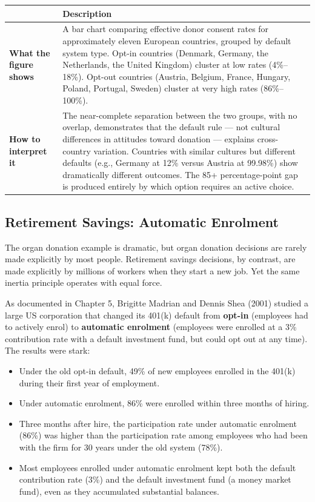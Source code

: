 \documentclass[12pt, letterpaper]{article}
\begin{document}
\begin{table}[H]
\centering
\small
\begin{tabularx}{\linewidth}{lY}
\toprule
 & Description \\
\midrule
\textbf{What the figure shows} & A bar chart comparing effective donor consent rates for approximately eleven European countries, grouped by default system type. Opt-in countries (Denmark, Germany, the Netherlands, the United Kingdom) cluster at low rates (4\%--18\%). Opt-out countries (Austria, Belgium, France, Hungary, Poland, Portugal, Sweden) cluster at very high rates (86\%--100\%). \\
\textbf{How to interpret it} & The near-complete separation between the two groups, with no overlap, demonstrates that the default rule --- not cultural differences in attitudes toward donation --- explains cross-country variation. Countries with similar cultures but different defaults (e.g., Germany at 12\% versus Austria at 99.98\%) show dramatically different outcomes. The 85+ percentage-point gap is produced entirely by which option requires an active choice. \\
\bottomrule
\end{tabularx}
\end{table}



\subsection{Retirement Savings: Automatic Enrolment}


The organ donation example is dramatic, but organ donation decisions are rarely made explicitly by most people. Retirement savings decisions, by contrast, are made explicitly by millions of workers when they start a new job. Yet the same inertia principle operates with equal force.

As documented in Chapter 5, Brigitte Madrian and Dennis Shea (2001) studied a large US corporation that changed its 401(k) default from \textbf{opt-in} (employees had to actively enrol) to \textbf{automatic enrolment} (employees were enrolled at a 3\% contribution rate with a default investment fund, but could opt out at any time). The results were stark:

\begin{itemize}
\item Under the old opt-in default, 49\% of new employees enrolled in the 401(k) during their first year of employment.
\item Under automatic enrolment, 86\% were enrolled within three months of hiring.
\item Three months after hire, the participation rate under automatic enrolment (86\%) was higher than the participation rate among employees who had been with the firm for 30 years under the old system (78\%).
\item Most employees enrolled under automatic enrolment kept both the default contribution rate (3\%) and the default investment fund (a money market fund), even as they accumulated substantial balances.
\end{itemize}
\end{document}
